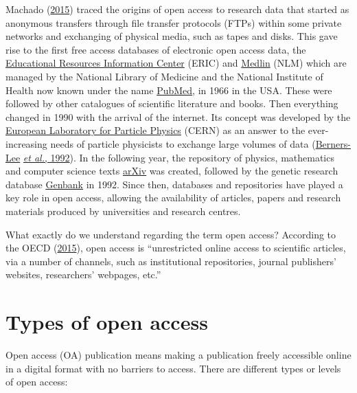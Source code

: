 \documentclass[
]{book}
\begin{document}
Machado (\href{https://goingdigital.oecd.org/data/notes/No13_ToolkitNote_OpenScience.pdf}{2015}) traced the origins of open access to research data that started as anonymous transfers through file transfer protocols (FTPs) within some private networks and exchanging of physical media, such as tapes and disks. This gave rise to the first free access databases of electronic open access data, the \href{http://www.eric.ed.gov/}{Educational Resources Information Center} (ERIC) and \href{https://www.nlm.nih.gov/}{Medlin} (NLM) which are managed by the National Library of Medicine and the National Institute of Health now known under the name \href{http://www.pubmed.gov/}{PubMed}, in 1966 in the USA. These were followed by other catalogues of scientific literature and books. Then everything changed in 1990 with the arrival of the internet. Its concept was developed by the \href{https://home.web.cern.ch/}{European Laboratory for Particle Physics} (CERN) as an answer to the ever-increasing needs of particle physicists to exchange large volumes of data (\href{https://www.academia.edu/2148655/World_Wide_Web_The_Information_Universe}{Berners-Lee} \href{https://www.academia.edu/2148655/World_Wide_Web_The_Information_Universe}{\emph{et al.}, 1992}). In the following year, the repository of physics, mathematics and computer science texts \href{http://arxiv.org/}{arXiv} was created, followed by the genetic research database \href{http://www.ncbi.nlm.nih.gov/genbank}{Genbank} in 1992. Since then, databases and repositories have played a key role in open access, allowing the availability of articles, papers and research materials produced by universities and research centres.

What exactly do we understand regarding the term open access? According to the OECD (\href{https://www.oecd-ilibrary.org/science-and-technology/making-open-science-a-reality_5jrs2f963zs1-en}{2015}), open access is ``unrestricted online access to scientific articles, via a number of channels, such as institutional repositories, journal publishers' websites, researchers' webpages, etc.''

\hypertarget{types-of-open-access}{%
\section{Types of open access}\label{types-of-open-access}}

Open access (OA) publication means making a publication freely accessible online in a digital format with no barriers to access. There are different types or levels of open access:
\end{document}
